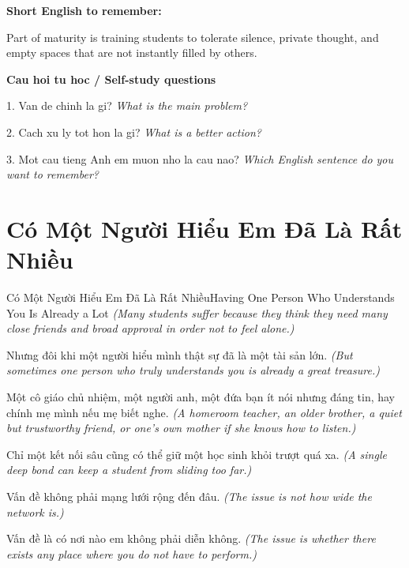 \begin{ghinhoanh}
\textbf{Short English to remember:}

Part of maturity is training students to tolerate silence, private thought, and empty spaces that are not instantly filled by others.

\end{ghinhoanh}

\begin{tuhocnhanh}
\textbf{Cau hoi tu hoc / Self-study questions}

1. Van de chinh la gi? \textit{What is the main problem?}

2. Cach xu ly tot hon la gi? \textit{What is a better action?}

3. Mot cau tieng Anh em muon nho la cau nao? \textit{Which English sentence do you want to remember?}
\end{tuhocnhanh}
\ngancach

\section{Có Một Người Hiểu Em Đã Là Rất Nhiều}
\begin{truyen}{Có Một Người Hiểu Em Đã Là Rất Nhiều}{Having One Person Who Understands You Is Already a Lot}
\textit{(Many students suffer because they think they need many close friends and broad approval in order not to feel alone.)}

Nhưng đôi khi một người hiểu mình thật sự đã là một tài sản lớn.
\textit{(But sometimes one person who truly understands you is already a great treasure.)}

Một cô giáo chủ nhiệm, một người anh, một đứa bạn ít nói nhưng đáng tin, hay chính mẹ mình nếu mẹ biết nghe.
\textit{(A homeroom teacher, an older brother, a quiet but trustworthy friend, or one’s own mother if she knows how to listen.)}

Chỉ một kết nối sâu cũng có thể giữ một học sinh khỏi trượt quá xa.
\textit{(A single deep bond can keep a student from sliding too far.)}

Vấn đề không phải mạng lưới rộng đến đâu.
\textit{(The issue is not how wide the network is.)}

Vấn đề là có nơi nào em không phải diễn không.
\textit{(The issue is whether there exists any place where you do not have to perform.)}

\end{truyen}

